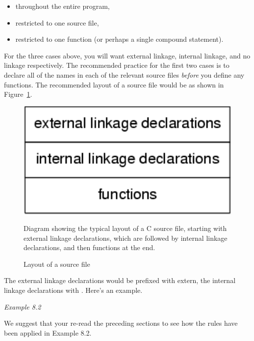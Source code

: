    \begin{itemize}
    \item throughout the entire program,

    \item restricted to one source file,

    \item restricted to one function (or perhaps a single compound
     statement).
   \end{itemize}

   For the three cases above, you will want external linkage, internal
    linkage, and no linkage respectively. The recommended practice for the
    first two cases is to declare all of the names in each of the relevant
    source files \textit{before} you define any functions. The recommended
    layout of a source file would be as shown in Figure~\ref{fig:srcFile}.


    \begin{figure}\centering
      \includegraphics[type=pdf,read=.pdf,ext=.pdf,scale=1.0]
      {figure/8.1_srcFile}
      \caption*{Diagram showing the typical layout of a C source file,
        starting with external linkage declarations,
        which are followed by internal linkage declarations,
        and then functions at the end.}
      \caption{\label{fig:srcFile}Layout of a source file}
    \end{figure}



   The external linkage declarations would be prefixed with extern, the
    internal linkage declarations with \static. Here's an
    example.


    \begin{center}\textit{Example 8.2}\end{center}


   We suggest that your re-read the preceding sections to see how the
    rules have been applied in Example 8.2.


